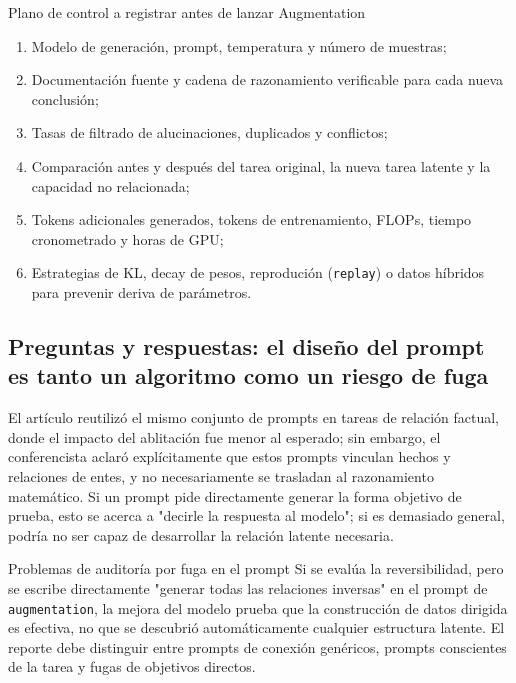 \documentclass[a4paper]{article}
\begin{document}
\begin{knowledgebox}{Plano de control a registrar antes de lanzar Augmentation}
\begin{enumerate}
  \item Modelo de generación, prompt, temperatura y número de muestras;
  \item Documentación fuente y cadena de razonamiento verificable para cada nueva conclusión;
  \item Tasas de filtrado de alucinaciones, duplicados y conflictos;
  \item Comparación antes y después del tarea original, la nueva tarea latente y la capacidad no relacionada;
  \item Tokens adicionales generados, tokens de entrenamiento, FLOPs, tiempo cronometrado y horas de GPU;
  \item Estrategias de KL, decay de pesos, reprodución (\texttt{replay}) o datos híbridos para prevenir deriva de parámetros.
\end{enumerate}
\end{knowledgebox}

\subsection{Preguntas y respuestas: el diseño del prompt es tanto un algoritmo como un riesgo de fuga}

El artículo reutilizó el mismo conjunto de prompts en tareas de relación factual, donde el impacto del ablitación fue menor al esperado; sin embargo, el conferencista aclaró explícitamente que estos prompts vinculan hechos y relaciones de entes, y no necesariamente se trasladan al razonamiento matemático. Si un prompt pide directamente generar la forma objetivo de prueba, esto se acerca a "decirle la respuesta al modelo"; si es demasiado general, podría no ser capaz de desarrollar la relación latente necesaria.


\begin{warningbox}{Problemas de auditoría por fuga en el prompt}
Si se evalúa la reversibilidad, pero se escribe directamente "generar todas las relaciones inversas" en el prompt de \texttt{augmentation}, la mejora del modelo prueba que la construcción de datos dirigida es efectiva, no que se descubrió automáticamente cualquier estructura latente. El reporte debe distinguir entre prompts de conexión genéricos, prompts conscientes de la tarea y fugas de objetivos directos.
\end{warningbox}
\end{document}

